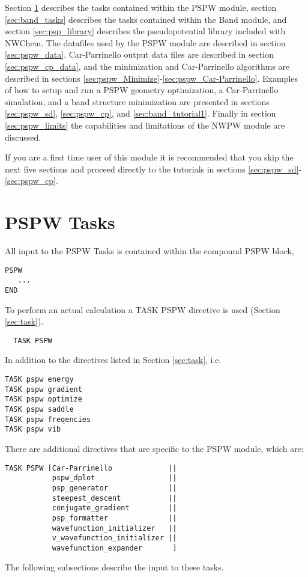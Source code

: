 Section \ref{sec:pspw_tasks} describes the tasks contained within the
PSPW module, section \ref{sec:band_tasks} describes the tasks
contained within the Band module, and section \ref{sec:psp_library}
describes the pseudopotential library included with NWChem.  The
datafiles used by the PSPW module are described in section
\ref{sec:pspw_data}.  Car-Parrinello output data files are described
in section \ref{sec:pspw_cp_data}, and the minimization and
Car-Parrinello algorithms are described in sections
\ref{sec:pspw_Minimize}-\ref{sec:pspw_Car-Parrinello}. Examples of how
to setup and run a PSPW geometry optimization, a Car-Parrinello
simulation, and a band structure minimization are presented in
sections \ref{sec:pspw_sd}, \ref{sec:pspw_cp}, and
\ref{sec:band_tutorial1}.  Finally in section \ref{sec:pspw_limits}
the capabilities and limitations of the NWPW module are  discussed.

If you are a first time user of this module it is recommended that you skip the next five sections and proceed directly to the tutorials in sections 
\ref{sec:pspw_sd}-\ref{sec:pspw_cp}.

\section{PSPW Tasks}
\label{sec:pspw_tasks}

All input to the PSPW Tasks is contained within the compound PSPW block,
\begin{verbatim}
PSPW
   ...
END
\end{verbatim}

To perform an actual calculation a TASK PSPW directive is used
(Section \ref{sec:task}).  
\begin{verbatim}
  TASK PSPW
\end{verbatim} 
In addition to the directives listed in Section \ref{sec:task}, i.e.
\begin{verbatim}
TASK pspw energy          
TASK pspw gradient         
TASK pspw optimize         
TASK pspw saddle           
TASK pspw freqencies       
TASK pspw vib
\end{verbatim}
There are additional directives that are specific to the PSPW module, which are:
\begin{verbatim}
TASK PSPW [Car-Parrinello             ||
           pspw_dplot                 ||
           psp_generator              ||
           steepest_descent           ||
           conjugate_gradient         ||
           psp_formatter              ||
           wavefunction_initializer   ||
           v_wavefunction_initializer ||
           wavefunction_expander       ]
\end{verbatim}
The following subsections describe the input to these tasks.

